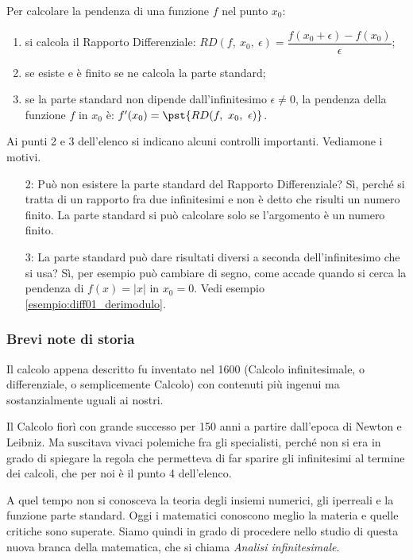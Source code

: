 \begin{procedura}
\label{proc:ricetta_pendenza}
Per calcolare la pendenza di una funzione \(f\) nel punto \(x_0\):
\begin{enumerate}
\item si calcola il Rapporto Differenziale:
\(RD(f,~x_0,~\epsilon)= \dfrac{f(x_0+\epsilon) -f(x_0)}{\epsilon}\);
\item se esiste e è finito se ne calcola la parte standard;
\item se la parte standard non dipende dall'infinitesimo 
\(\epsilon \neq 0\), la pendenza della funzione \(f\) in \(x_0\) è:
\(f'(x_0) = \pst{RD(f,~x_0,~\epsilon)}\).
\end{enumerate}
\end{procedura}
\begin{osservazione}
Ai punti 2 e 3 dell'elenco si indicano alcuni controlli importanti.
Vediamone i motivi.
 \begin{itemize}
  \item [2:] Può non esistere la parte standard del Rapporto 
Differenziale? Sì, perché si tratta di un rapporto fra due infinitesimi 
e non è detto che risulti un numero finito. La parte standard si può 
calcolare solo se l'argomento è un numero finito.
\item [3:] La parte standard può dare risultati diversi a seconda 
dell'infinitesimo che si usa? Sì, per esempio può cambiare di segno, come 
accade quando si cerca la pendenza di \(f(x)=|x|\) in \(x_0=0\). 
Vedi esempio \ref{esempio:diff01_derimodulo}.
 \end{itemize}
\end{osservazione}

\subsubsection{Brevi note di storia}
Il calcolo appena descritto fu inventato nel 1600 (Calcolo infinitesimale, o 
differenziale, o semplicemente Calcolo) con contenuti più ingenui ma 
sostanzialmente uguali ai nostri. 

Il Calcolo fiorì con grande successo per 150 anni a partire 
dall'epoca di Newton e Leibniz. 
Ma suscitava vivaci polemiche fra gli specialisti, perché non si era 
in grado di spiegare la regola che permetteva di far sparire gli 
infinitesimi al termine dei calcoli, che per noi è il punto 4 dell'elenco.

A quel tempo non si conosceva la teoria degli insiemi numerici, 
gli iperreali e la funzione parte standard.
Oggi i matematici conoscono meglio la materia e quelle critiche 
sono superate. 
Siamo quindi in grado di procedere nello studio di questa nuova branca 
della matematica, che si chiama \emph{Analisi infinitesimale}.


